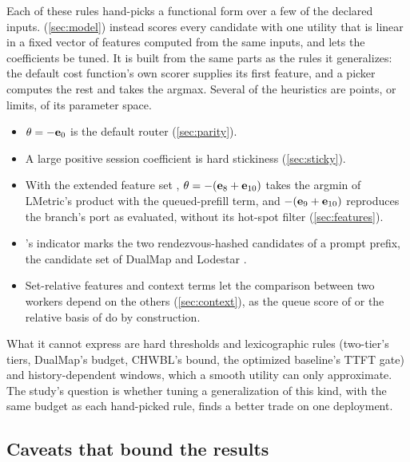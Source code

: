 Each of these rules hand-picks a functional form over a few of the declared inputs. \lc{}
(\cref{sec:model}) instead scores every candidate with one utility that is linear in a fixed vector
of features computed from the same inputs, and lets the coefficients be tuned. It is built from the
same parts as the rules it generalizes: the default cost function's own scorer supplies its first
feature, and a picker computes the rest and takes the argmax. Several of the heuristics are points,
or limits, of its parameter space.
\begin{itemize}
  \item $\theta = -\mathbf{e}_{0}$ is the default router (\cref{sec:parity}).
  \item A large positive session coefficient is hard stickiness (\cref{sec:sticky}).
  \item With the extended feature set , $\theta = -(\mathbf{e}_{8} + \mathbf{e}_{10})$ takes the
    argmin of LMetric's product with the queued-prefill term, and $-(\mathbf{e}_{9} + \mathbf{e}_{10})$
    reproduces the branch's  port as evaluated, without its hot-spot filter
    (\cref{sec:features}).
  \item {}'s  indicator marks the two rendezvous-hashed candidates of a
    prompt prefix, the candidate set of DualMap and Lodestar \citep{yuan2026dualmap,lim2026lodestar}.
  \item Set-relative features and context terms let the comparison between two workers depend on
    the others (\cref{sec:context}), as the queue score of  or the
    relative basis of  do by construction.
\end{itemize}
What it cannot express are hard thresholds and lexicographic rules (two-tier's tiers, DualMap's
budget, CHWBL's bound, the optimized baseline's TTFT gate) and history-dependent windows, which a
smooth utility can only approximate. The study's question is whether tuning a generalization
of this kind, with the same budget as each hand-picked rule, finds a better trade on one deployment.

\subsection{Caveats that bound the results}
\label{sec:caveats}

